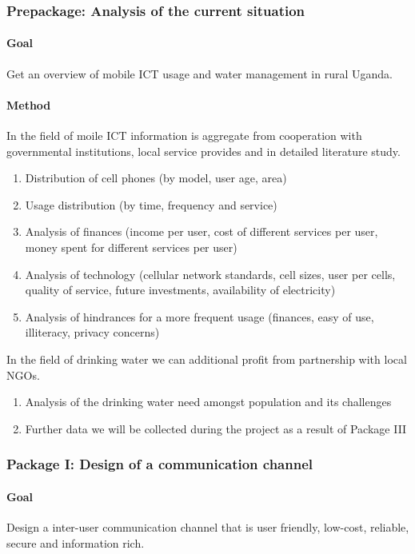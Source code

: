 \documentclass[11pt]{article}
\begin{document}
\subsubsection*{Prepackage: Analysis of the current situation}
\paragraph{Goal} Get an overview of mobile ICT usage and water management in rural Uganda.
\paragraph{Method}
In the field of moile ICT information is aggregate from cooperation with governmental institutions, local service provides and in detailed literature study.
\begin{enumerate}
 \item Distribution of cell phones (by model, user age, area)
 \item Usage distribution (by time, frequency and service)
 \item Analysis of finances (income per user, cost of different services per user, money spent for different services per user)
 \item Analysis of technology (cellular network standards, cell sizes, user per cells, quality of service, future investments, availability of electricity)
 \item Analysis of hindrances for a more frequent usage (finances, easy of use, illiteracy, privacy concerns)
\end{enumerate}
In the field of drinking water we can additional profit from partnership with local NGOs.
\begin{enumerate}
 \item Analysis of the drinking water need amongst population and its challenges
 \item Further data we will be collected during the project as a result of Package III
\end{enumerate}







\subsubsection*{Package I: Design of a communication channel}
\paragraph{Goal} Design a inter-user communication channel that is user friendly, low-cost, reliable, secure and information rich.
\end{document}
